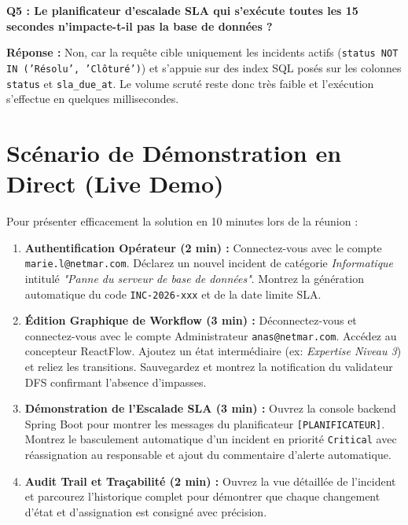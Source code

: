 \documentclass[12pt,a4paper]{article}
\begin{document}
\begin{mdframed}[backgroundcolor=lightbg, linecolor=primary, linewidth=1pt]
\textbf{Q5 : Le planificateur d'escalade SLA qui s'exécute toutes les 15 secondes n'impacte-t-il pas la base de données ?}
\end{mdframed}
\textbf{Réponse :} Non, car la requête cible uniquement les incidents actifs (\texttt{status NOT IN ('Résolu', 'Clôturé')}) et s'appuie sur des index SQL posés sur les colonnes \texttt{status} et \texttt{sla\_due\_at}. Le volume scruté reste donc très faible et l'exécution s'effectue en quelques millisecondes.

\clearpage

\section{Scénario de Démonstration en Direct (Live Demo)}

Pour présenter efficacement la solution en 10 minutes lors de la réunion :

\begin{enumerate}[label=\textbf{Étape \arabic* :}]
    \item \textbf{Authentification Opérateur (2 min) :}
    Connectez-vous avec le compte \texttt{marie.l@netmar.com}. Déclarez un nouvel incident de catégorie \textit{Informatique} intitulé \textit{"Panne du serveur de base de données"}. Montrez la génération automatique du code \texttt{INC-2026-xxx} et de la date limite SLA.
    
    \item \textbf{Édition Graphique de Workflow (3 min) :}
    Déconnectez-vous et connectez-vous avec le compte Administrateur \texttt{anas@netmar.com}. Accédez au concepteur ReactFlow. Ajoutez un état intermédiaire (ex: \textit{Expertise Niveau 3}) et reliez les transitions. Sauvegardez et montrez la notification du validateur DFS confirmant l'absence d'impasses.
    
    \item \textbf{Démonstration de l'Escalade SLA (3 min) :}
    Ouvrez la console backend Spring Boot pour montrer les messages du planificateur \texttt{[PLANIFICATEUR]}. Montrez le basculement automatique d'un incident en priorité \texttt{Critical} avec réassignation au responsable et ajout du commentaire d'alerte automatique.
    
    \item \textbf{Audit Trail et Traçabilité (2 min) :}
    Ouvrez la vue détaillée de l'incident et parcourez l'historique complet pour démontrer que chaque changement d'état et d'assignation est consigné avec précision.
\end{enumerate}
\end{document}
